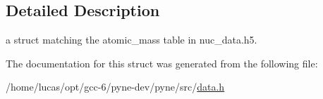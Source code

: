\subsection{Detailed Description}
a struct matching the atomic\+\_\+mass table in nuc\+\_\+data.\+h5. 

The documentation for this struct was generated from the following file\+:\begin{DoxyCompactItemize}
\item 
/home/lucas/opt/gcc-\/6/pyne-\/dev/pyne/src/\hyperlink{data_8h}{data.\+h}\end{DoxyCompactItemize}
